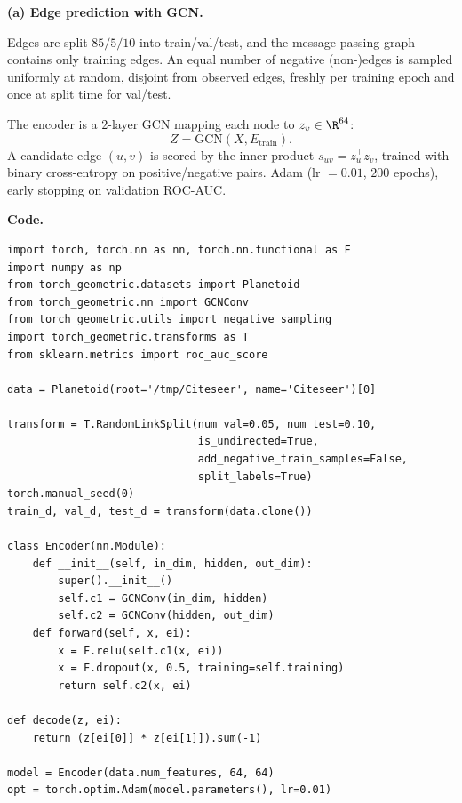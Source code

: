 \documentclass{article}
\begin{document}
\begin{tcolorbox}[colback=white, colframe=black!75, breakable, title=\textbf{Solution to Exercise 2}]
\textbf{(a) Edge prediction with GCN.}

Edges are split $85/5/10$ into train/val/test, and the message-passing graph contains only training edges. An equal number of negative (non-)edges is sampled uniformly at random, disjoint from observed edges, freshly per training epoch and once at split time for val/test.

The encoder is a $2$-layer GCN mapping each node to $z_v\in\R^{64}$:
\[
Z = \text{GCN}(X,E_{\text{train}}).
\]
A candidate edge $(u,v)$ is scored by the inner product $s_{uv}=z_u^\top z_v$, trained with binary cross-entropy on positive/negative pairs. Adam (lr $=0.01$, $200$ epochs), early stopping on validation ROC-AUC.

\medskip
\textbf{Code.}
\begin{lstlisting}[style=python2]
import torch, torch.nn as nn, torch.nn.functional as F
import numpy as np
from torch_geometric.datasets import Planetoid
from torch_geometric.nn import GCNConv
from torch_geometric.utils import negative_sampling
import torch_geometric.transforms as T
from sklearn.metrics import roc_auc_score

data = Planetoid(root='/tmp/Citeseer', name='Citeseer')[0]

transform = T.RandomLinkSplit(num_val=0.05, num_test=0.10,
                              is_undirected=True,
                              add_negative_train_samples=False,
                              split_labels=True)
torch.manual_seed(0)
train_d, val_d, test_d = transform(data.clone())

class Encoder(nn.Module):
    def __init__(self, in_dim, hidden, out_dim):
        super().__init__()
        self.c1 = GCNConv(in_dim, hidden)
        self.c2 = GCNConv(hidden, out_dim)
    def forward(self, x, ei):
        x = F.relu(self.c1(x, ei))
        x = F.dropout(x, 0.5, training=self.training)
        return self.c2(x, ei)

def decode(z, ei):
    return (z[ei[0]] * z[ei[1]]).sum(-1)

model = Encoder(data.num_features, 64, 64)
opt = torch.optim.Adam(model.parameters(), lr=0.01)


\end{lstlisting}
\end{tcolorbox}
\end{document}

